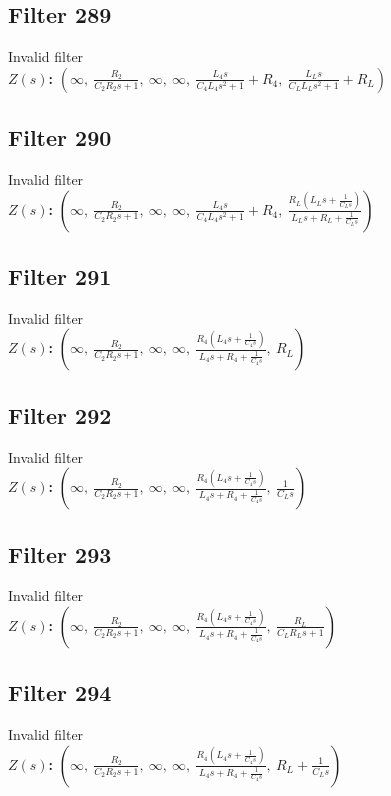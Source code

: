 \documentclass{article}
\begin{document}
\subsection*{Filter 289}
Invalid filter \\ 
\textbf{$Z(s)$:} $\left( \infty, \  \frac{R_{2}}{C_{2} R_{2} s + 1}, \  \infty, \  \infty, \  \frac{L_{4} s}{C_{4} L_{4} s^{2} + 1} + R_{4}, \  \frac{L_{L} s}{C_{L} L_{L} s^{2} + 1} + R_{L}\right)$ \\ 
\subsection*{Filter 290}
Invalid filter \\ 
\textbf{$Z(s)$:} $\left( \infty, \  \frac{R_{2}}{C_{2} R_{2} s + 1}, \  \infty, \  \infty, \  \frac{L_{4} s}{C_{4} L_{4} s^{2} + 1} + R_{4}, \  \frac{R_{L} \left(L_{L} s + \frac{1}{C_{L} s}\right)}{L_{L} s + R_{L} + \frac{1}{C_{L} s}}\right)$ \\ 
\subsection*{Filter 291}
Invalid filter \\ 
\textbf{$Z(s)$:} $\left( \infty, \  \frac{R_{2}}{C_{2} R_{2} s + 1}, \  \infty, \  \infty, \  \frac{R_{4} \left(L_{4} s + \frac{1}{C_{4} s}\right)}{L_{4} s + R_{4} + \frac{1}{C_{4} s}}, \  R_{L}\right)$ \\ 
\subsection*{Filter 292}
Invalid filter \\ 
\textbf{$Z(s)$:} $\left( \infty, \  \frac{R_{2}}{C_{2} R_{2} s + 1}, \  \infty, \  \infty, \  \frac{R_{4} \left(L_{4} s + \frac{1}{C_{4} s}\right)}{L_{4} s + R_{4} + \frac{1}{C_{4} s}}, \  \frac{1}{C_{L} s}\right)$ \\ 
\subsection*{Filter 293}
Invalid filter \\ 
\textbf{$Z(s)$:} $\left( \infty, \  \frac{R_{2}}{C_{2} R_{2} s + 1}, \  \infty, \  \infty, \  \frac{R_{4} \left(L_{4} s + \frac{1}{C_{4} s}\right)}{L_{4} s + R_{4} + \frac{1}{C_{4} s}}, \  \frac{R_{L}}{C_{L} R_{L} s + 1}\right)$ \\ 
\subsection*{Filter 294}
Invalid filter \\ 
\textbf{$Z(s)$:} $\left( \infty, \  \frac{R_{2}}{C_{2} R_{2} s + 1}, \  \infty, \  \infty, \  \frac{R_{4} \left(L_{4} s + \frac{1}{C_{4} s}\right)}{L_{4} s + R_{4} + \frac{1}{C_{4} s}}, \  R_{L} + \frac{1}{C_{L} s}\right)$ \\ 
\end{document}
